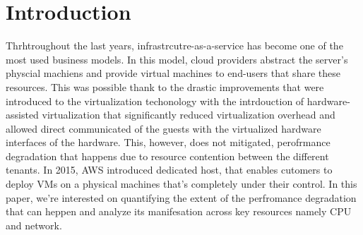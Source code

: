 \chapter{Introduction}\label{chapter:introduction}

Thrhtroughout the last years, infrastrcutre-as-a-service has become one of the most used business models. 
In this model, cloud providers abstract the server's physcial machiens and provide virtual machines to end-users
that share these resources. This was possible thank to the drastic improvements that were introduced 
to the virtualization techonology with the intrdouction of hardware-assisted virtualization that significantly 
reduced virtualization overhead and allowed direct communicated of the guests with the virtualized hardware
interfaces of the hardware. This, however, does not mitigated, perofrmance degradation that happens due 
to resource contention between the different tenants. In 2015, AWS introduced dedicated host, that enables
cutomers to deploy VMs on a physical machines that's completely under their control. In this paper, we're 
interested on quantifying the extent of the perfromance degradation that can heppen and analyze its 
manifesation across key resources namely CPU and network. 